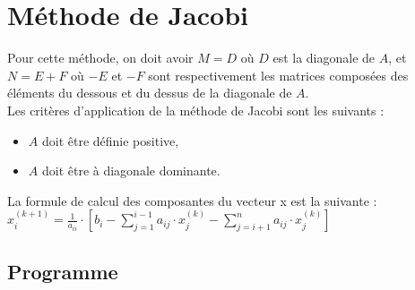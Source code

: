 \documentclass{report}
\begin{document}
    \section{Méthode de Jacobi}
      Pour cette méthode, on doit avoir $M=D$ où $D$ est la diagonale de $A$, et $N=E+F$ où $-E$ et $-F$ sont respectivement les matrices composées des éléments du dessous et du dessus de la diagonale de $A$.\\
      Les critères d'application de la méthode de Jacobi sont les suivants :
      \begin{itemize}
        \item{$A$ doit être définie positive,}
        \item{$A$ doit être à diagonale dominante.}
      \end{itemize}
      La formule de calcul des composantes du vecteur x est la suivante :\\
      $x_{i}^{(k+1)} = \frac{1}{a_{ii}} \cdot \left [ b_{i} - \sum_{j=1}^{i-1} a_{ij} \cdot x_{j}^{(k)} - \sum_{j=i+1}^{n} a_{ij} \cdot x_{j}^{(k)} \right ] $
      \subsection{Programme}
        
\end{document}
